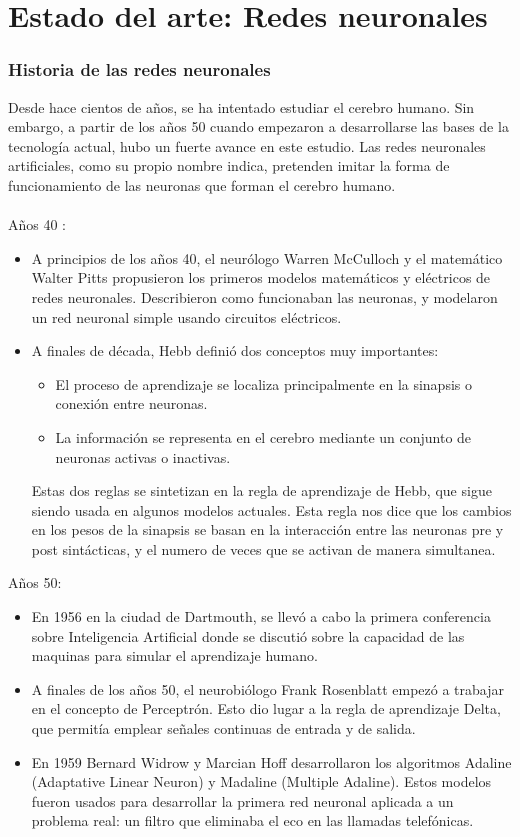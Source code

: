 \chapter{Estado del arte: Redes neuronales}
\subsection {Historia de las redes neuronales}
Desde hace cientos de años, se ha intentado estudiar el cerebro humano. Sin embargo, a partir de los años 50 cuando empezaron a desarrollarse las bases de la tecnología actual, hubo un fuerte avance en este estudio. Las redes neuronales artificiales, como su propio nombre indica, pretenden imitar la forma de funcionamiento de las neuronas que forman el cerebro humano.
\\\\Años 40 :
\begin{itemize}

\item A principios de los años 40, el neurólogo Warren McCulloch y el matemático Walter Pitts propusieron los primeros modelos matemáticos y eléctricos de redes neuronales. Describieron como funcionaban las neuronas, y modelaron un red neuronal simple usando circuitos eléctricos.
\item A finales de década, Hebb definió dos conceptos muy importantes:
\begin{itemize}
\item El proceso de aprendizaje se localiza principalmente en la sinapsis o conexión entre neuronas.
\item La información se representa en el cerebro mediante un conjunto de neuronas activas o inactivas.
\end{itemize}
Estas dos reglas se sintetizan en la regla de aprendizaje de Hebb, que sigue siendo usada en algunos modelos actuales. Esta regla nos dice que los cambios en los pesos de la sinapsis se basan en la interacción entre las neuronas pre y post sintácticas, y el numero de veces que se activan de manera simultanea.
\end{itemize}
Años 50:
\begin{itemize}
\item En 1956 en la ciudad de Dartmouth, se llevó a cabo la primera conferencia sobre Inteligencia Artificial donde se discutió sobre la capacidad de las maquinas para simular el aprendizaje humano.
\item A finales de los años 50,  el neurobiólogo Frank Rosenblatt empezó a trabajar en el concepto de Perceptrón. Esto dio lugar a la regla de aprendizaje Delta, que permitía emplear señales continuas de entrada y de salida.
\item En 1959 Bernard Widrow y Marcian Hoff desarrollaron los algoritmos Adaline (Adaptative Linear Neuron) y Madaline (Multiple Adaline). Estos modelos fueron usados para desarrollar la primera red neuronal aplicada a un problema real: un filtro que eliminaba el eco en las llamadas telefónicas.
\end{itemize}
